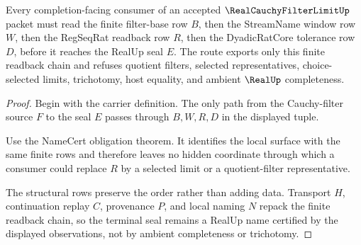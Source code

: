 \begin{theorem}
\label{thm:real-cauchy-filter-limit-regular-readback}
Every completion-facing consumer of an accepted $\RealCauchyFilterLimitUp$ packet must read the finite filter-base row $B$, then the StreamName window row $W$, then the RegSeqRat readback row $R$, then the DyadicRatCore tolerance row $D$, before it reaches the RealUp seal $E$. The route exports only this finite readback chain and refuses quotient filters, selected representatives, choice-selected limits, trichotomy, host equality, and ambient $\RealUp$ completeness.
\end{theorem}
\begin{proof}
Begin with the carrier definition. The only path from the Cauchy-filter source $F$ to the seal $E$ passes through $B,W,R,D$ in the displayed tuple.

Use the NameCert obligation theorem. It identifies the local surface with the same finite rows and therefore leaves no hidden coordinate through which a consumer could replace $R$ by a selected limit or a quotient-filter representative.

The structural rows preserve the order rather than adding data. Transport $H$, continuation replay $C$, provenance $P$, and local naming $N$ repack the finite readback chain, so the terminal seal remains a RealUp name certified by the displayed observations, not by ambient completeness or trichotomy.
\end{proof}

\begin{closurestatus}{\RealCauchyFilterLimitUp}
  \theoryclosure{\seedClosure}
  \formalstatus{\unformalizedV}
\end{closurestatus}

